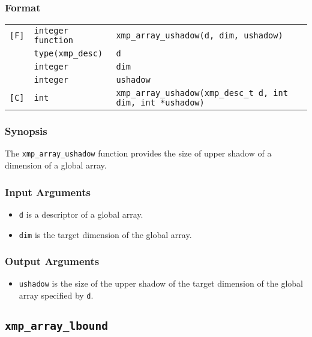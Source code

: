 \subsubsection*{Format}

\begin{tabular}{lll}

\verb![F]!& {\tt integer function}& {\tt xmp\_array\_ushadow(d, dim, ushadow)}\\
          & {\tt type(xmp\_desc)} & {\tt d}\\
          & {\tt integer} & {\tt dim}\\
          & {\tt integer} & {\tt ushadow}\\

\verb![C]!&  {\tt int}& {\tt xmp\_array\_ushadow(xmp\_desc\_t d, int dim, int *ushadow)}\\

\end{tabular}

\subsubsection*{Synopsis}

The {\tt xmp\_array\_ushadow} function provides the size of upper shadow
of a dimension of a global array.


\subsubsection*{Input Arguments}
\begin{itemize}
 \item {\tt d} is a descriptor of a global array.
 \item {\tt dim} is the target dimension of the global array.
\end{itemize}

\subsubsection*{Output Arguments}
\begin{itemize}
 \item {\tt ushadow} is the size of the upper shadow of the target
       dimension of the global array specified by {\tt d}.
\end{itemize}


\subsection{\tt xmp\_array\_lbound}

